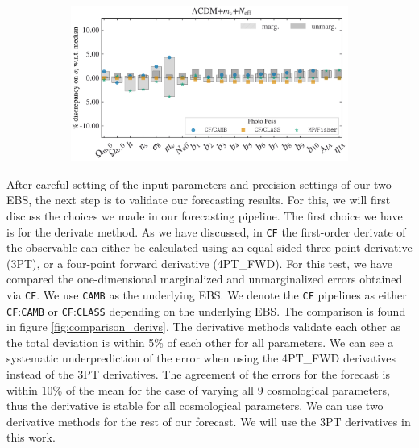 \documentclass[oneside]{book}
\newcommand*{\cosmicfish}{\texttt{CF}\xspace}
\newcommand*{\class}{{\tt CLASS}\xspace}
\newcommand*{\camb}{{\tt CAMB}\xspace}
\begin{document}
\begin{figure}
\begin{subfigure}[b]{0.49\textwidth}
    \end{subfigure}
    \hfill
    \begin{subfigure}[b]{0.49\textwidth}
        \centering
        \includegraphics[width=\textwidth]{Photo_Pess_mnu+Neff_error_comparison.pdf}
    \end{subfigure}    
       \label{fig:Comparison_MN} 
\end{figure}
After careful setting of the input parameters and precision settings of our two EBS, the next step is to validate our forecasting results. For this, we will first discuss the choices we made in our forecasting pipeline. The first choice we have is for the derivate method. As we have discussed, in \cosmicfish the first-order derivate of the observable can either be calculated using an equal-sided three-point derivative (3PT), or a four-point forward derivative (4PT\_FWD). For this test, we have compared the one-dimensional marginalized and unmarginalized errors obtained via \cosmicfish. We use \camb as the underlying EBS. We denote the \cosmicfish pipelines as either \cosmicfish:\camb or \cosmicfish:\class depending on the underlying EBS. The comparison is found in figure \ref{fig:comparison_derivs}. The derivative methods validate each other as the total deviation is within 5\% of each other for all parameters. We can see a systematic underprediction of the error when using the 4PT\_FWD derivatives instead of the 3PT derivatives. The agreement of the errors for the forecast is within 10\% of the mean for the case of varying all 9 cosmological parameters, thus the derivative is stable for all cosmological parameters. We can use two derivative methods for the rest of our forecast. We will use the 3PT derivatives in this work.\\
\end{document}
